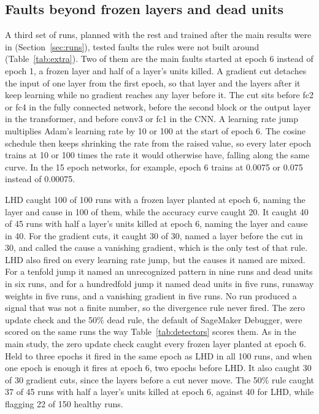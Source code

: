 \documentclass[11pt]{article}
\begin{document}
\subsection{Faults beyond frozen layers and dead units}
\label{sec:extra}

A third set of runs, planned with the rest and trained after the main results were in (Section~\ref{sec:runs}), tested faults the rules were not built around (Table~\ref{tab:extra}). Two of them are the main faults started at epoch 6 instead of epoch 1, a frozen layer and half of a layer's units killed. A gradient cut detaches the input of one layer from the first epoch, so that layer and the layers after it keep learning while no gradient reaches any layer before it. The cut sits before fc2 or fc4 in the fully connected network, before the second block or the output layer in the transformer, and before conv3 or fc1 in the CNN. A learning rate jump multiplies Adam's learning rate by 10 or 100 at the start of epoch 6. The cosine schedule then keeps shrinking the rate from the raised value, so every later epoch trains at 10 or 100 times the rate it would otherwise have, falling along the same curve. In the 15 epoch networks, for example, epoch 6 trains at 0.0075 or 0.075 instead of 0.00075.

LHD caught 100 of 100 runs with a frozen layer planted at epoch 6, naming the layer and cause in 100 of them, while the accuracy curve caught 20. It caught 40 of 45 runs with half a layer's units killed at epoch 6, naming the layer and cause in 40. For the gradient cuts, it caught 30 of 30, named a layer before the cut in 30, and called the cause a vanishing gradient, which is the only test of that rule. LHD also fired on every learning rate jump, but the causes it named are mixed. For a tenfold jump it named an unrecognized pattern in nine runs and dead units in six runs, and for a hundredfold jump it named dead units in five runs, runaway weights in five runs, and a vanishing gradient in five runs. No run produced a signal that was not a finite number, so the divergence rule never fired. The zero update check and the 50\% dead rule, the default of SageMaker Debugger, were scored on the same runs the way Table~\ref{tab:detectors} scores them. As in the main study, the zero update check caught every frozen layer planted at epoch 6. Held to three epochs it fired in the same epoch as LHD in all 100 runs, and when one epoch is enough it fires at epoch 6, two epochs before LHD. It also caught 30 of 30 gradient cuts, since the layers before a cut never move. The 50\% rule caught 37 of 45 runs with half a layer's units killed at epoch 6, against 40 for LHD, while flagging 22 of 150 healthy runs.
\end{document}
